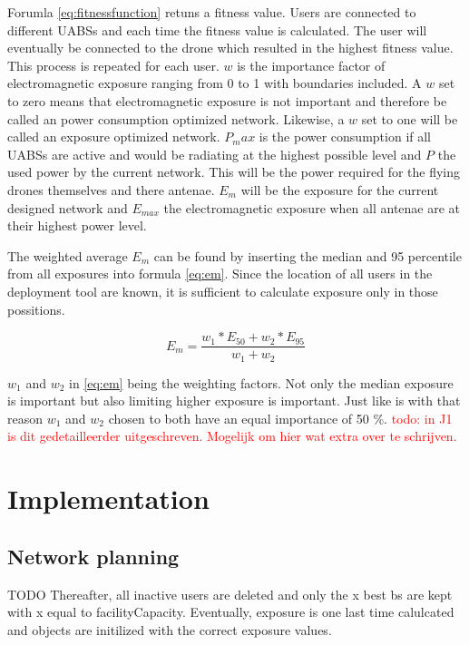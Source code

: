 Forumla \ref{eq:fitnessfunction} retuns a fitness value. Users are connected to different \gls{UABS}s and each time the fitness value is 
calculated. The user will eventually be connected to the drone which resulted in the highest fitness value. This process is repeated for each user.
$w$ is the importance factor of electromagnetic exposure ranging from 0 to 1 with boundaries included. A $w$ set to zero means that electromagnetic 
exposure is not important and therefore be called an power consumption optimized network. Likewise, a $w$ set to one will be called an exposure optimized 
network. $P_max$ is the power consumption if all \gls{UABS}s are active and would be radiating at the highest possible level and $P$ the used power by the current network. 
This will be the power required for the flying drones themselves and there antenae.
$E_m$ will be the exposure for the current designed network and $E_{max}$ the electromagnetic exposure when all antenae are at their highest power level.

The weighted average $E_m$ can be found by inserting the median and 95 percentile from all exposures into formula \ref{eq:em}. Since the location of all users in 
the deployment tool are known, it is sufficient to calculate exposure only in those possitions. 

\begin{equation} 
E_m = \frac{w_1 * E_{50} + w_2 * E_{95}}{w_1 + w_2}
\label{eq:em}
\end{equation}

$w_1$ and $w_2$ in \ref{eq:em} being the weighting factors. Not only the median exposure is important but also limiting higher exposure is important. 
Just like \cite{J1} is with that reason $w_1$ and $w_2$ chosen to both have an equal importance of 50 \%.
\textcolor{red}{todo: in J1 is dit gedetailleerder uitgeschreven. Mogelijk om hier wat extra over te schrijven.}


\section{Implementation}

\subsection{Network planning}
TODO
Thereafter, all inactive users are deleted and only the x best bs are kept with x equal to facilityCapacity.
Eventually, exposure is one last time calulcated and objects are initilized with the correct exposure values.

